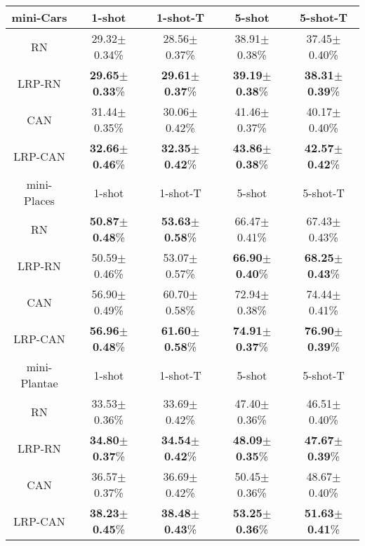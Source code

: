 \documentclass[a4paper,conference]{IEEEtran}
\begin{document}
\begin{table*}[htb]
\begin{tabular}{c c c c c}
      mini-Cars     & 1-shot                  &1-shot-T                 & 5-shot                   & 5-shot-T \\ \hline
      RN            & 29.32$\pm$0.34\%          &28.56$\pm$0.37\%           & 38.91$\pm$0.38\%           &37.45$\pm$0.40\%\\ 
      LRP-RN        & \textbf{29.65}$\pm$\textbf{0.33}\% &\textbf{29.61}$\pm$\textbf{0.37}\%  & \textbf{39.19}$\pm$\textbf{0.38}\%  &\textbf{38.31}$\pm$\textbf{0.39}\%\\ 
      CAN           & 31.44$\pm$0.35\%          &30.06$\pm$0.42\%           & 41.46$\pm$0.37\%           &40.17$\pm$0.40\%\\
      LRP-CAN       & \textbf{32.66}$\pm$\textbf{0.46}\% &\textbf{32.35}$\pm$\textbf{0.42}\%  &\textbf{43.86}$\pm$\textbf{0.38}\%  &\textbf{42.57}$\pm$\textbf{0.42}\%\\ 
\hline\hline
      
      mini-Places   & 1-shot                  &1-shot-T                 & 5-shot                   & 5-shot-T \\ \hline
      RN            & \textbf{50.87}$\pm$\textbf{0.48}\% &\textbf{53.63}$\pm$\textbf{0.58}\%  & 66.47$\pm$0.41\%           &67.43$\pm$0.43\%\\ 
      LRP-RN        & 50.59$\pm$0.46\%          &53.07$\pm$0.57\%           & \textbf{66.90}$\pm$\textbf{0.40}\%  &\textbf{68.25}$\pm$\textbf{0.43}\%\\ 
      CAN           & 56.90$\pm$0.49\%          &60.70$\pm$0.58\%           & 72.94$\pm$0.38\%           &74.44$\pm$0.41\%\\
      LRP-CAN       & \textbf{56.96}$\pm$\textbf{0.48}\%&\textbf{61.60}$\pm$\textbf{0.58}\%   & \textbf{74.91}$\pm$\textbf{0.37}\%  &\textbf{76.90}$\pm$\textbf{0.39}\%\\ 
\hline\hline
      
      mini-Plantae  & 1-shot                  &1-shot-T                 & 5-shot                   & 5-shot-T \\ \hline
      RN            & 33.53$\pm$0.36\%          &33.69$\pm$0.42\%           & 47.40$\pm$0.36\%           &46.51$\pm$0.40\%\\ 
      LRP-RN        & \textbf{34.80}$\pm$\textbf{0.37}\% &\textbf{34.54}$\pm$\textbf{0.42}\% & \textbf{48.09}$\pm$\textbf{0.35}\%  &\textbf{47.67}$\pm$\textbf{0.39}\%\\       
      CAN           & 36.57$\pm$0.37\%          &36.69$\pm$0.42\%           & 50.45$\pm$0.36\%           &48.67$\pm$0.40\%\\
      LRP-CAN       & \textbf{38.23}$\pm$\textbf{0.45}\% &\textbf{38.48}$\pm$\textbf{0.43}\% & \textbf{53.25}$\pm$\textbf{0.36}\% &\textbf{51.63}$\pm$\textbf{0.41}\%\\ 
\hline
    \end{tabular}

    \label{tab:accuracy_single domain}
\end{table*}
\end{document}
